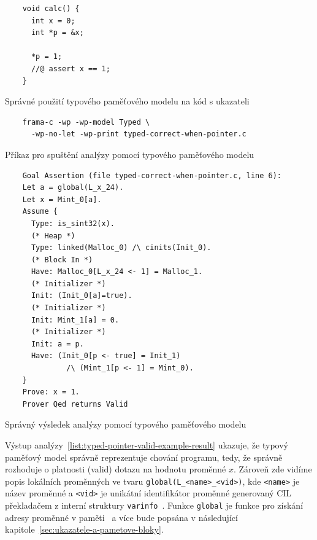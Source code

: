 \begin{listing}[H]
    \begin{verbatim}
    void calc() {
      int x = 0;
      int *p = &x;

      *p = 1;
      //@ assert x == 1;
    }
    \end{verbatim}
    \caption{Správné použití typového paměťového modelu na kód s ukazateli}
    \label{list:typed-pointer-valid-example}
\end{listing}

\begin{listing}[H]
    \begin{verbatim}
    frama-c -wp -wp-model Typed \
      -wp-no-let -wp-print typed-correct-when-pointer.c
    \end{verbatim}
    \caption{Příkaz pro spuštění analýzy pomocí typového paměťového modelu}
    \label{list:typed-pointer-valid-example-run}
\end{listing}

\begin{listing}[H]
    \begin{verbatim}
    Goal Assertion (file typed-correct-when-pointer.c, line 6):
    Let a = global(L_x_24).
    Let x = Mint_0[a].
    Assume {
      Type: is_sint32(x).
      (* Heap *)
      Type: linked(Malloc_0) /\ cinits(Init_0).
      (* Block In *)
      Have: Malloc_0[L_x_24 <- 1] = Malloc_1.
      (* Initializer *)
      Init: (Init_0[a]=true).
      (* Initializer *)
      Init: Mint_1[a] = 0.
      (* Initializer *)
      Init: a = p.
      Have: (Init_0[p <- true] = Init_1)
              /\ (Mint_1[p <- 1] = Mint_0).
    }
    Prove: x = 1.
    Prover Qed returns Valid
    \end{verbatim}
    \caption{Správný výsledek analýzy pomocí typového paměťového modelu}
    \label{list:typed-pointer-valid-example-result}
\end{listing}

Výstup analýzy~\ref{list:typed-pointer-valid-example-result} ukazuje,
že typový paměťový model správně reprezentuje chování programu,
tedy, že správně rozhoduje o platnosti (valid) dotazu na hodnotu proměnné $x$.
Zároveň zde vidíme popis lokálních proměnných ve tvaru \texttt{global(L\_<name>\_<vid>)},
kde \texttt{<name>} je název proměnné a \texttt{<vid>} je unikátní identifikátor proměnné
generovaný CIL překladačem z interní struktury \texttt{varinfo}~\cite{FCPluginDevSignoles2024}.
Funkce \texttt{global} je funkce pro získání adresy proměnné v paměti~\cite{BlanchardWP2024}
a více bude popsána v následující kapitole~\ref{sec:ukazatele-a-pametove-bloky}.

